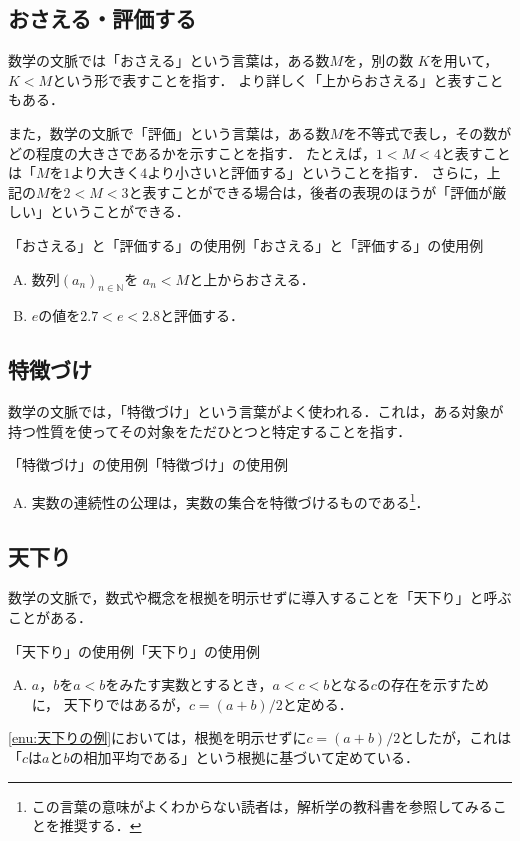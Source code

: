 \subsection{おさえる・評価する}

数学の文脈では「おさえる」という言葉は，ある数$M$を，別の数 $K$を用いて，$K<M$という形で表すことを指す．
より詳しく「上からおさえる」と表すこともある．

また，数学の文脈で「評価」という言葉は，ある数$M$を不等式で表し，その数がどの程度の大きさであるかを示すことを指す．
たとえば，$ 1 < M <4$と表すことは「$M$を$1$より大きく$4$より小さいと評価する」ということを指す．
さらに，上記の$M$を$ 2< M <3$と表すことができる場合は，後者の表現のほうが「評価が厳しい」ということができる．

\begin{example}{「おさえる」と「評価する」の使用例}{「おさえる」と「評価する」の使用例}
  \begin{enumerate}[(A)]
    \item 数列$(a_n)_{n \in \mathbb{N}}$を $ a_n <M$と上からおさえる．
    \item $e$の値を$2.7 < e < 2.8$と評価する．
  \end{enumerate}
\end{example}


\subsection{特徴づけ}

数学の文脈では，「特徴づけ」という言葉がよく使われる．これは，ある対象が持つ性質を使ってその対象をただひとつと特定することを指す．

\begin{example}{「特徴づけ」の使用例}{「特徴づけ」の使用例}
  \begin{enumerate}[(A)]
    \item 実数の連続性の公理は，実数の集合を特徴づけるものである\footnote{この言葉の意味がよくわからない読者は，解析学の教科書を参照してみることを推奨する．}．
  \end{enumerate}
\end{example}

\subsection{天下り}

数学の文脈で，数式や概念を根拠を明示せずに導入することを「天下り」と呼ぶことがある．

\begin{example}{「天下り」の使用例}{「天下り」の使用例}
  \begin{enumerate}[(A)]
    \item $a$，$b$を$a<b$をみたす実数とするとき，$ a < c < b$となる$c$の存在を示すために，
    天下りではあるが，$c=(a+b)/2$と定める\label{enu:天下りの例}．
  \end{enumerate}
\end{example}

\ref{enu:天下りの例}においては，根拠を明示せずに$c=(a+b)/2$としたが，これは「$c$は$a$と$b$の相加平均である」という根拠に基づいて定めている．

